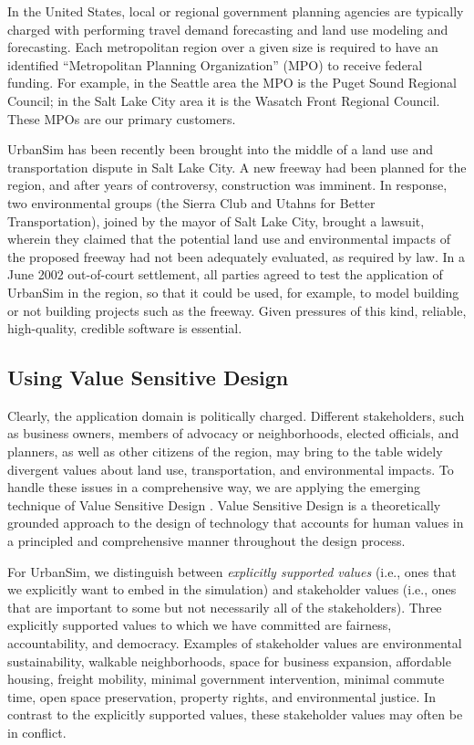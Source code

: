 \documentclass[times, 10pt,twocolumn]{article}
\begin{document}
In the United States, local or regional government planning agencies are
typically charged with performing travel demand forecasting and land use
modeling and forecasting.  Each metropolitan region over a given size is
required to have an identified ``Metropolitan Planning Organization'' (MPO)
to receive federal funding.  For example, in the Seattle area the MPO is
the Puget Sound Regional Council; in the Salt Lake City area it is the
Wasatch Front Regional Council.  These MPOs are our primary customers.

UrbanSim has been recently been brought into the middle of a land use and
transportation dispute in Salt Lake City.  A new freeway had been planned
for the region, and after years of controversy, construction was imminent.
In response, two environmental groups (the Sierra Club and Utahns for
Better Transportation), joined by the mayor of Salt Lake City, brought a
lawsuit, wherein they claimed that the potential land use and environmental
impacts of the proposed freeway had not been adequately evaluated, as
required by law.  In a June 2002 out-of-court settlement, all parties
agreed to test the application of UrbanSim in the region, so that it could
be used, for example, to model building or not building projects such as
the freeway.  Given pressures of this kind, reliable, high-quality,
credible software is essential.

\subsection{Using Value Sensitive Design}
\label{vsd}

Clearly, the application domain is politically charged.  Different
stakeholders, such as business owners, members of advocacy or
neighborhoods, elected officials, and planners, as well as other citizens
of the region, may bring to the table widely divergent values about land
use, transportation, and environmental impacts.  To handle these issues in
a comprehensive way, we are applying the emerging technique of Value
Sensitive Design \cite{friedman-tr-2002}.  Value Sensitive Design is a
theoretically grounded approach to the design of technology that accounts
for human values in a principled and comprehensive manner throughout the
design process.

For UrbanSim, we distinguish between \emph{explicitly supported values}
(i.e., ones that we explicitly want to embed in the simulation) and
stakeholder values (i.e., ones that are important to some but not
necessarily all of the stakeholders).  Three explicitly supported values to
which we have committed are fairness, accountability, and democracy.
Examples of stakeholder values are environmental sustainability, walkable
neighborhoods, space for business expansion, affordable housing, freight
mobility, minimal government intervention, minimal commute time, open space
preservation, property rights, and environmental justice.  In contrast to
the explicitly supported values, these stakeholder values may often be in
conflict.  
\end{document}
